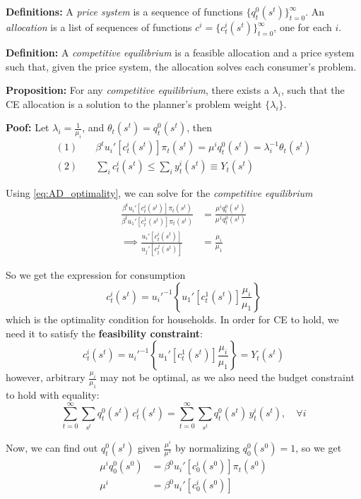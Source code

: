 \documentclass[twocolumn, fleqn]{article}
\numberwithin{equation}{section}
\begin{document}
	\textbf{Definitions:} A \textit{price system} is a sequence of functions 
		$\{q_t^0(s^t)\}_{t=0}^\infty$. An \textit{allocation} is a list of sequences of functions 
		$c^i = \{c_t^i(s^t)\}_{t=0}^\infty$, one for each $i$.


	\textbf{Definition:} A \textit{competitive equilibrium} is a feasible allocation and a price system 
	such that, given the price system, the allocation solves each consumer’s problem.
	\vspace{1em}
	
	\textbf{Proposition:} For any \textit{competitive equilibrium}, there exists a $\lambda_i$, such that the CE allocation is a solution to the planner's problem weight $\{\lambda_i\}$.
	
	\textbf{Poof:} Let $\lambda_i=\frac{1}{\mu_i}$, and $\theta_t(s^t) = q_t^0(s^t)$, then 
	\begin{align*}
		(1) \quad &\beta^t u_i'\left[c_t^i(s^t)\right] \pi_t(s^t) = \mu^i q_t^0(s^t)= \lambda_i^{-1} \theta_t(s^t)\\[1em]
		(2) \quad &\sum_i c_t^i (s^t) \leq \sum_i y_t^i(s^t) \equiv Y_t (s^t)
	\end{align*}
	
	Using \eqref{eq:AD_optimality}, we can solve for the \textit{competitive equilibrium}
	\begin{align*}
		\frac{\beta^t u_i'\left[c_t^i(s^t)\right] \pi_t(s^t)}{\beta^t u_1'\left[c_t^1(s^t)\right] \pi_t(s^t)} &= \frac{\mu^i q_t^0(s^t)}{\mu^1 q_t^0(s^t)}\\[1em]
		\implies \frac{u_i'\left[ c_t^i(s^t) \right]}{u_j'\left[ c_t^j(s^t) \right]} &= \frac{\mu_i}{\mu_1}
	\end{align*}
	
	So we get the expression for consumption 
	\begin{equation}
		c_t^i(s^t) = {u_i'}^{-1} \left\{ u_1'\left[ c_t^1(s^t) \right] \frac{\mu_i}{\mu_1} \right\} \label{eq:AD_cons}
	\end{equation}
	which is the optimality condition for households. In order for CE to hold, we need it to satisfy the \textbf{feasibility constraint}:
	\[c_t^i(s^t) = {u_i'}^{-1} \left\{ u_1'\left[ c_t^1(s^t) \right] \frac{\mu_i}{\mu_1} \right\} = Y_t(s^t)\]
	however, arbitrary $\frac{\mu_i}{\mu_1}$ may not be optimal, as we also need the budget constraint to hold with equality:
	\[\sum_{t=0}^{\infty} \sum_{s^t} q_t^0(s^t) \, c_t^i(s^t) 
	= \sum_{t=0}^{\infty} \sum_{s^t} q_t^0(s^t) \, y_t^i(s^t), \quad \forall i\]
	
	Now, we can find out $q_t^0(s^t)$ given $\frac{\mu^i}{\mu^1}$ by normalizing $q_0^0(s^0)=1$, so we get
	\begin{align*}
		 \mu^i q_0^0(s^0) &=\beta^0 u_i'\left[c_0^i(s^0)\right] \pi_t(s^0) \\
		 \mu^i &=\beta^0 u_i'\left[c_0^i(s^0)\right]
	\end{align*}
	
\end{document}
